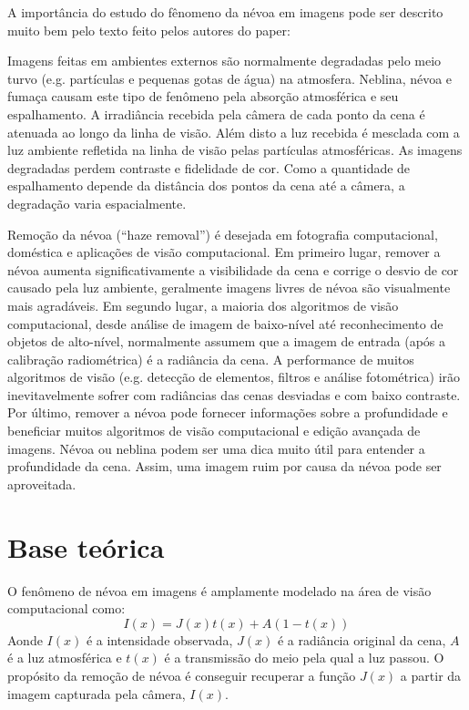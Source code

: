 \documentclass[12pt,openany, oneside,
 article, 
 a4paper, hyphens, english, brazil]{abntex2}
\begin{document}
A importância do estudo do fênomeno da névoa em imagens pode ser descrito muito bem pelo texto feito pelos autores do paper:
\begin{citacao}
Imagens feitas em ambientes externos são normalmente degradadas pelo meio turvo (e.g. partículas e pequenas gotas de água) na atmosfera. Neblina, névoa e fumaça causam este tipo de fenômeno pela absorção atmosférica e seu espalhamento. A irradiância recebida pela câmera de cada ponto da cena é atenuada ao longo da linha de visão. Além disto a luz recebida é mesclada com a luz ambiente refletida na linha de visão pelas partículas atmosféricas. As imagens degradadas perdem contraste e fidelidade de cor. Como a quantidade de espalhamento depende da distância dos pontos da cena até a câmera, a degradação varia espacialmente. 

Remoção da névoa (``haze removal'') é desejada em fotografia computacional, doméstica e aplicações de visão computacional. Em primeiro lugar, remover a névoa aumenta significativamente a visibilidade da cena e corrige o desvio de cor causado pela luz ambiente, geralmente imagens livres de névoa são visualmente mais agradáveis. Em segundo lugar, a maioria dos algoritmos de visão computacional, desde análise de imagem de baixo-nível até reconhecimento de objetos de alto-nível, normalmente assumem que a imagem de entrada (após a calibração radiométrica) é a radiância da cena. A performance de muitos algoritmos de visão (e.g. detecção de elementos, filtros e análise fotométrica) irão inevitavelmente sofrer com radiâncias das cenas desviadas e com baixo contraste. Por último, remover a névoa pode fornecer informações sobre a profundidade e beneficiar muitos algoritmos de visão computacional e edição avançada de imagens. Névoa ou neblina podem ser uma dica muito útil para entender a profundidade da cena. Assim, uma imagem ruim por causa da névoa pode ser aproveitada.
\cite[nossa tradução]{HazeRemoval}
\end{citacao}

\section{Base teórica}
O fenômeno de névoa em imagens é amplamente modelado na área de visão computacional como:
\begin{equation} \label{eq:1}
I(x) = J(x)t(x) + A(1 - t(x))
\end{equation}
Aonde $I(x)$ é a intensidade observada, $J(x)$ é a radiância original da cena, $A$ é a luz atmosférica e $t(x)$ é a transmissão do meio pela qual a luz passou. O propósito da remoção de névoa é conseguir recuperar a função $J(x)$ a partir da imagem capturada pela câmera, $I(x)$.
\end{document}
